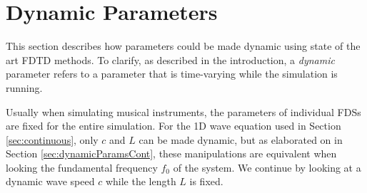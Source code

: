 \section{Dynamic Parameters}\label{sec:dynamicParams}
This section describes how parameters could be made dynamic using state of the art FDTD methods. %
To clarify, as described in the introduction, a \textit{dynamic} parameter refers to a parameter that is time-varying while the simulation is running. 


Usually when simulating musical instruments, the parameters of individual FDSs are fixed for the entire simulation. For the 1D wave equation used in Section \ref{sec:continuous}, only $c$ and $L$ can be made dynamic, but as elaborated on in Section \ref{sec:dynamicParamsCont}, these manipulations are equivalent when looking the fundamental frequency $f_0$ of the system. We continue by looking at a dynamic wave speed $c$ while the length $L$ is fixed. %


